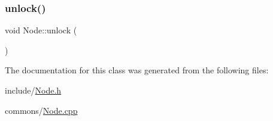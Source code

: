\mbox{\label{class_node_a4123708bb2755ae24fa5e120a8f028b6}} 
\subsubsection{\texorpdfstring{unlock()}{unlock()}}
{\footnotesize\ttfamily void Node\+::unlock (\begin{DoxyParamCaption}{ }\end{DoxyParamCaption})\hspace{0.3cm}{\ttfamily [inline]}}



The documentation for this class was generated from the following files\+:\begin{DoxyCompactItemize}
\item 
include/\mbox{\hyperlink{_node_8h}{Node.\+h}}\item 
commons/\mbox{\hyperlink{_node_8cpp}{Node.\+cpp}}\end{DoxyCompactItemize}
